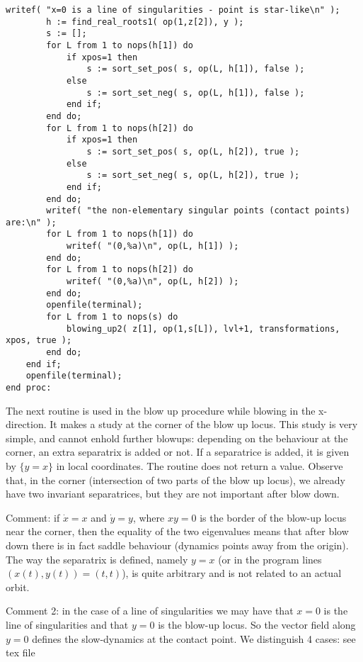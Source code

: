 \documentclass[a4paper,10pt]{article}
\begin{document}
\begin{lstlisting}[name=blowup]
        writef( "x=0 is a line of singularities - point is star-like\n" );
        h := find_real_roots1( op(1,z[2]), y );
        s := [];
        for L from 1 to nops(h[1]) do
            if xpos=1 then
                s := sort_set_pos( s, op(L, h[1]), false );
            else
                s := sort_set_neg( s, op(L, h[1]), false );
            end if;
        end do;
        for L from 1 to nops(h[2]) do
            if xpos=1 then
                s := sort_set_pos( s, op(L, h[2]), true );
            else
                s := sort_set_neg( s, op(L, h[2]), true );
            end if;
        end do;
        writef( "the non-elementary singular points (contact points) are:\n" );
        for L from 1 to nops(h[1]) do
            writef( "(0,%a)\n", op(L, h[1]) );
        end do;
        for L from 1 to nops(h[2]) do
            writef( "(0,%a)\n", op(L, h[2]) );
        end do;
        openfile(terminal);
        for L from 1 to nops(s) do
            blowing_up2( z[1], op(1,s[L]), lvl+1, transformations, xpos, true );
        end do;
    end if;
    openfile(terminal);
end proc:
\end{lstlisting}

The next routine is used in the blow up procedure while blowing in the x-direction.
It makes a study at the corner of the blow up locus.  This study is very simple,
and cannot enhold further blowups: depending on the behaviour at the corner,
an extra separatrix is added or not.  If a separatrice is added, it is given by $\{y=x\}$ in
local coordinates. The routine does not return a value.  Observe that, in the corner
(intersection of two parts of the blow up locus), we already have two invariant separatrices,
but they are not important after blow down.

Comment: if $\dot{x}=x$ and $\dot{y}=y$, where $xy=0$ is the border of the blow-up locus near the corner, then the equality of the two eigenvalues
means that after blow down there is in fact saddle behaviour (dynamics points away from the origin).  The way the separatrix is defined, namely $y=x$ (or in the program lines $(x(t),y(t))=(t,t)$), is quite arbitrary and is not related to an actual orbit.

Comment 2: in the case of  a line of singularities we may have that ${x=0}$ is the line of singularities and that ${y=0}$ is the blow-up locus.  So the vector field along ${y=0}$ defines the slow-dynamics at the contact point.  We distinguish 4 cases: see tex file
%
\end{document}
